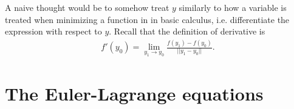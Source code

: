 A naive thought would be to somehow treat $y$ similarly to how a variable is treated when minimizing a function in in basic calculus,
i.e. differentiate the expression with respect to $y$. Recall that the definition of derivative is
\begin{align*}
  f'(y_0) = \lim_{y_1 \to y_0}\frac{f(y_1) - f(y_0)}{||y_1 - y_0||}.
\end{align*}


\section{The Euler-Lagrange equations}

